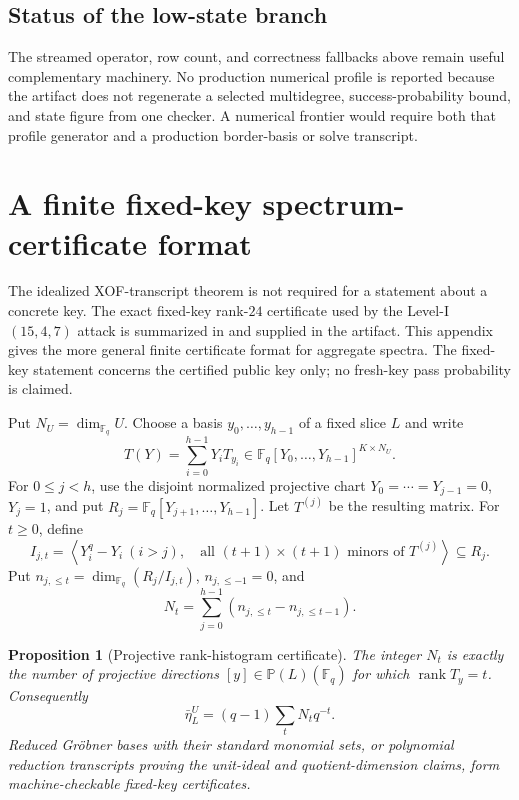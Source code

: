 \documentclass[11pt]{article}
\newtheorem{proposition}[theorem]{Proposition}
\newcommand{\F}{\mathbb F}
\newcommand{\rank}{\operatorname{rank}}
\begin{document}
\subsection{Status of the low-state branch}
The streamed operator, row count, and correctness fallbacks above remain
useful complementary machinery.  No production numerical profile is reported
because the artifact does not regenerate a selected multidegree,
success-probability bound, and state figure from one checker.  A numerical frontier would
require both that profile generator and a production border-basis or solve
transcript.


\section{A finite fixed-key spectrum-certificate format}\label{app:fixed-key-spectrum}
The idealized XOF-transcript theorem is not required for a statement about a concrete key.
The exact fixed-key rank-$24$ certificate used by the Level-I $(15,4,7)$
attack is summarized in  and supplied in the artifact.
This appendix gives the more general finite certificate format for aggregate
spectra.  The fixed-key statement concerns the certified public key only; no
fresh-key pass probability is claimed.

Put $N_U=\dim_{\F_q}U$.  Choose a basis
$y_0,\ldots,y_{h-1}$ of a fixed slice $L$ and write
\[
 T(Y)=\sum_{i=0}^{h-1}Y_iT_{y_i}
 \in\F_q[Y_0,\ldots,Y_{h-1}]^{K\times N_U}.
\]
For $0\le j<h$, use the disjoint normalized projective chart
$Y_0=\cdots=Y_{j-1}=0$, $Y_j=1$, and put
$R_j=\F_q[Y_{j+1},\ldots,Y_{h-1}]$.  Let $T^{(j)}$ be the resulting matrix.
For $t\ge0$, define
\begin{equation}
 I_{j,t}=\left\langle
   Y_i^q-Y_i\ (i>j),\quad
   \text{all }(t+1)\times(t+1)\text{ minors of }T^{(j)}
 \right\rangle\subseteq R_j.                        \label{eq:histogram-ideal}
\end{equation}
Put $n_{j,\le t}=\dim_{\F_q}(R_j/I_{j,t})$,
$n_{j,\le-1}=0$, and
\begin{equation}
  N_t=\sum_{j=0}^{h-1}(n_{j,\le t}-n_{j,\le t-1}). \label{eq:histogram-count}
\end{equation}

\begin{proposition}[Projective rank-histogram certificate]
\label{prop:projective-histogram}
The integer $N_t$ is exactly the number of projective directions
$[y]\in\mathbb P(L)(\F_q)$ for which $\rank T_y=t$.  Consequently
\begin{equation}
  \bar\eta_L^U=(q-1)\sum_tN_tq^{-t}.                 \label{eq:histogram-eta}
\end{equation}
Reduced Gr\"obner bases with their standard monomial sets, or polynomial
reduction transcripts proving the unit-ideal and quotient-dimension claims,
form machine-checkable fixed-key certificates.
\end{proposition}
\end{document}
